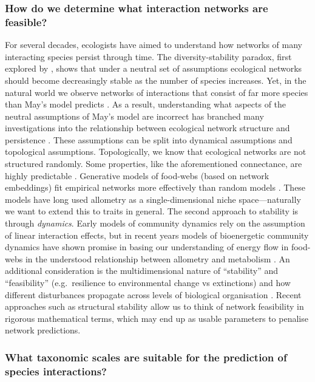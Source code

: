 \subsubsection{How do we determine what interaction networks are
feasible?}\label{how-do-we-determine-what-interaction-networks-are-feasible}

For several decades, ecologists have aimed to understand how networks of
many interacting species persist through time. The diversity-stability
paradox, first explored by \cite{May1974StaCom}, shows that under a neutral
set of assumptions ecological networks should become decreasingly stable
as the number of species increases. Yet, in the natural world we observe
networks of interactions that consist of far more species than May's
model predicts \cite{Albouy2019MarFis}. As a result, understanding what
aspects of the neutral assumptions of May's model are incorrect has
branched many investigations into the relationship between ecological
network structure and persistence \cite{Allesina2012StaCri}. These
assumptions can be split into dynamical assumptions and topological
assumptions. Topologically, we know that ecological networks are not
structured randomly. Some properties, like the aforementioned
connectance, are highly predictable \cite{MacDonald2020RevLin}.
Generative models of food-webs (based on network embeddings) fit
empirical networks more effectively than random models
\cite{Allesina2008GenMod}. These models have long used allometry as a
single-dimensional niche space---naturally we want to extend this to
traits in general. The second approach to stability is through
\emph{dynamics}. Early models of community dynamics rely on the
assumption of linear interaction effects, but in recent years models of
bioenergetic community dynamics have shown promise in basing our
understanding of energy flow in food-webs in the understood relationship
between allometry and metabolism \cite{Delmas2017SimBio}. An additional
consideration is the multidimensional nature of ``stability'' and
``feasibility'' (e.g.~resilience to environmental change vs extinctions)
\cite{Dominguez-Garcia2019UnvDim} and how different disturbances
propagate across levels of biological organisation \cite{Kefi2019AdvOur,
Gravel2016StaCom}. Recent approaches such as structural stability
\cite{Saavedra2017StrApp, Ferrera2016EffCom} allow us to think of
network feasibility in rigorous mathematical terms, which may end up as
usable parameters to penalise network predictions.

\subsubsection{What taxonomic scales are suitable for the prediction of
species
interactions?}\label{what-taxonomic-scales-are-suitable-for-the-prediction-of-species-interactions}

